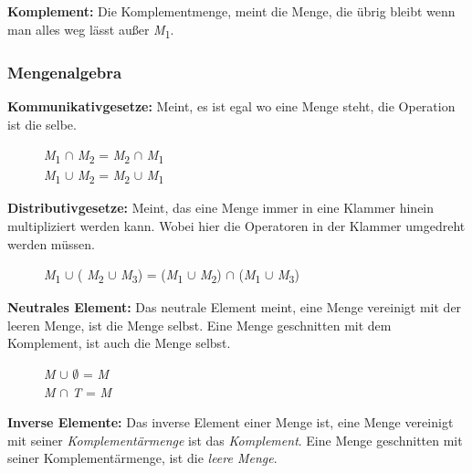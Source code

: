 \textbf{Komplement:} Die Komplementmenge, meint die Menge, die übrig bleibt wenn man alles weg lässt außer \textit{M}\textsubscript{1}.\\



\newpage
\subsubsection{Mengenalgebra}

\textbf{Kommunikativgesetze:} Meint, es ist egal wo eine Menge steht, die Operation ist die selbe.\\
\begin{figure}[H]
\centering
\textit{M}\textsubscript{1} $\cap$ \textit{M}\textsubscript{2} = 
\textit{M}\textsubscript{2} $\cap$ \textit{M}\textsubscript{1}\\

\textit{M}\textsubscript{1} $\cup$ \textit{M}\textsubscript{2} = 
\textit{M}\textsubscript{2} $\cup$ \textit{M}\textsubscript{1} \\
\end{figure}


\textbf{Distributivgesetze:} Meint, das eine Menge immer in eine Klammer hinein multipliziert werden kann. Wobei hier die Operatoren in der Klammer umgedreht werden müssen.\\
\begin{figure}[H]
\centering
\textit{M}\textsubscript{1} $\cup$ ( \textit{M}\textsubscript{2} $\cup$ \textit{M}\textsubscript{3}) =
(\textit{M}\textsubscript{1} $\cup$ \textit{M}\textsubscript{2}) $\cap$ (\textit{M}\textsubscript{1} $\cup$ \textit{M}\textsubscript{3})
\end{figure}


\textbf{Neutrales Element:} Das neutrale Element meint, eine Menge vereinigt mit der leeren Menge, ist die Menge selbst. Eine Menge geschnitten mit dem Komplement, ist auch die Menge selbst. \\
\begin{figure}[H]
\centering
\textit{M} $\cup$ $\emptyset$ = \textit{M}\\
\textit{M} $\cap$ \textit{T} = \textit{M}
\end{figure}




\textbf{Inverse Elemente:} Das inverse Element einer Menge ist, eine Menge vereinigt mit seiner \textit{Komplementärmenge} ist das \textit{Komplement}. Eine Menge geschnitten mit seiner Komplementärmenge, ist die \textit{leere Menge}.\\
\begin{figure}[H]
\centering
\end{figure}

